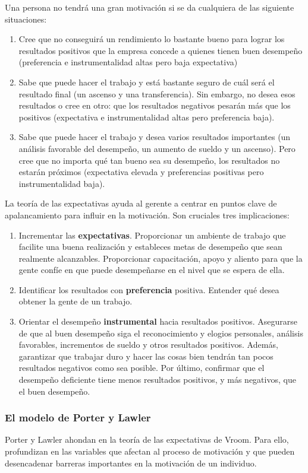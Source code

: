 \documentclass[12pt]{article}
\theoremstyle{definition_wo_parentheses}
\begin{document}
Una persona no tendrá una gran motivación si se da cualquiera de las siguiente situaciones:
\begin{enumerate}
\item Cree que no conseguirá un rendimiento lo bastante bueno para lograr los resultados positivos que la empresa concede a quienes tienen buen desempeño (preferencia e instrumentalidad altas pero baja expectativa)
\item Sabe que puede hacer el trabajo y está bastante seguro de cuál será el resultado final (un ascenso y una transferencia). Sin embargo, no desea esos resultados o cree en otro: que los resultados negativos pesarán más que los positivos (expectativa e instrumentalidad altas pero preferencia baja).
\item Sabe que puede hacer el trabajo y desea varios resultados importantes (un análisis favorable del desempeño, un aumento de sueldo y un ascenso). Pero cree que no importa qué tan bueno sea su desempeño, los resultados no estarán próximos (expectativa elevada y preferencias positivas pero instrumentalidad baja).
\end{enumerate}

La teoría de las expectativas ayuda al gerente a centrar en puntos clave de apalancamiento para influir en la motivación. Son cruciales tres implicaciones:
\begin{enumerate}
\item Incrementar las \textbf{expectativas}. Proporcionar un ambiente de trabajo que facilite una buena realización y estableces metas de desempeño que sean realmente alcanzables. Proporcionar capacitación, apoyo y aliento para que la gente confíe en que puede desempeñarse en el nivel que se espera de ella.
\item Identificar los resultados con \textbf{preferencia} positiva. Entender qué desea obtener la gente de un trabajo.
\item Orientar el desempeño \textbf{instrumental} hacia resultados positivos. Asegurarse de que al buen desempeño siga el reconocimiento y elogios personales, análisis favorables, incrementos de sueldo y otros resultados positivos. Además, garantizar que trabajar duro y hacer las cosas bien tendrán tan pocos resultados negativos como sea posible. Por último, confirmar que el desempeño deficiente tiene menos resultados positivos, y más negativos, que el buen desempeño.
\end{enumerate}

\subsubsection{El modelo de Porter y Lawler}
Porter y Lawler ahondan en la teoría de las expectativas de Vroom. Para ello, profundizan en las variables que afectan al proceso de motivación y que pueden desencadenar barreras importantes en la motivación de un individuo.
\end{document}
